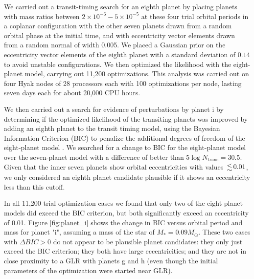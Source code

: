 \documentclass[fleqn,usenatbib]{mnras} %
\begin{document}
We carried out a transit-timing search for an eighth planet by placing
planets with mass ratios between $2\times 10^{-6}-5\times 10^{-5}$ at 
these four trial orbital periods
in a coplanar configuration with the other seven planets drawn from
a random orbital phase at the initial time, and with eccentricity
vector elements drawn from a random normal of width 0.005.   We
placed a Gaussian prior on the eccentricity vector elements of the eighth planet
with a standard deviation of $0.14$ to avoid unstable configurations.
We then optimized the likelihood with the eight-planet model, carrying
out 11,200 optimizations.  This analysis was carried out on four Hyak nodes of 28 processors each with 100 optimizations per node, lasting seven days each for about 20,000 CPU hours.

We then carried out a search for evidence of perturbations by planet i by
determining if the optimized likelihood of the transiting planets was improved
by adding an eighth planet to the transit timing model, using
the Bayesian Information Criterion (BIC) to penalize the additional degrees
of freedom of the eight-planet model \citep{Wit2012}.  We searched for a change 
to BIC for the eight-planet model over the seven-planet model with a difference
of better than $5\log{N_\mathrm{trans}} = 30.5$.  Given that the inner seven
planets show orbital eccentricities with values $\la 0.01$, we only considered
an eighth planet candidate plausible if it shows an eccentricity less than
this cutoff.

In all 11,200 trial optimization cases we found that only two of the eight-planet models 
did exceed the BIC criterion, but both significantly exceed an eccentricity
of 0.01.  Figure  \ref{fig:planet_i} shows the change in BIC versus
orbital period and mass for planet "i", assuming a mass of the star
of $M_* = 0.09 M_\odot$.   These two cases with $\Delta BIC {>} 0$
do not appear to be plausible
planet candidates:  they only just exceed the BIC criterion;  they
both have large eccentricities; and they are not in close proximity to a
GLR with planets g and h (even though the initial parameters of the optimization were started near GLR).
\end{document}
